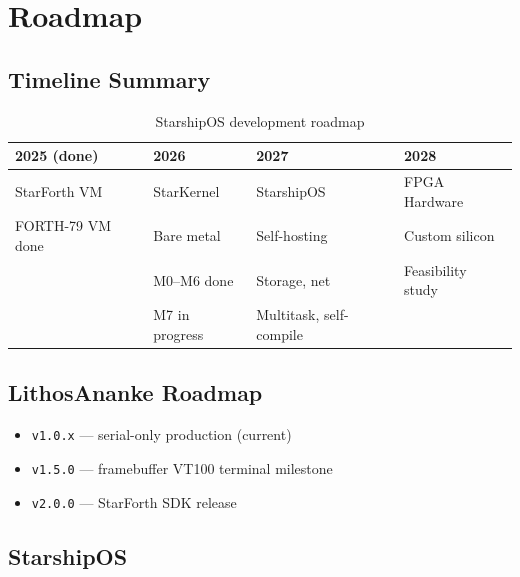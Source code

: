 
\chapter{Roadmap}
\label{vol3:chap:roadmap}


\section{Timeline Summary}
\label{vol3:sec:roadmap:timeline}


\begin{table}[ht]
  \centering
  \caption{StarshipOS development roadmap}
  \label{tab:roadmap}
  \begin{tabular}{llll}
    \toprule
    2025 (done) & 2026 & 2027 & 2028 \\
    \midrule
    StarForth VM & StarKernel & StarshipOS & FPGA Hardware \\
    FORTH-79 VM done & Bare metal & Self-hosting & Custom silicon \\
                & M0--M6 done & Storage, net & Feasibility study \\
                & M7 in progress & Multitask, self-compile & \\
    \bottomrule
  \end{tabular}
\end{table}

\section{LithosAnanke Roadmap}
\label{vol3:sec:roadmap:lithos}


\begin{itemize}
  \item \texttt{v1.0.x} — serial-only production (current)
  \item \texttt{v1.5.0} — framebuffer VT100 terminal milestone
  \item \texttt{v2.0.0} — StarForth SDK release
\end{itemize}

\section{StarshipOS}
\label{vol3:sec:roadmap:starshipos}

